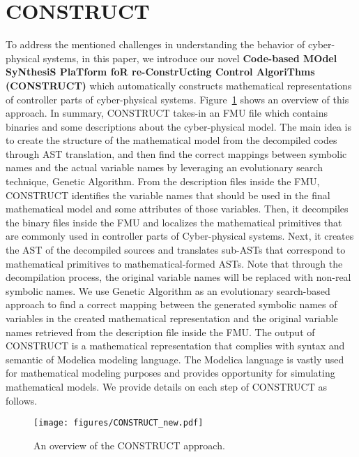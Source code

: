 \section{CONSTRUCT}
\label{sec:Construct}
To address the mentioned challenges in understanding the behavior of cyber-physical systems, in this paper, we introduce our novel \textbf{Code-based MOdel SyNthesiS PlaTform foR re-ConstrUcting Control AlgoriThms} \textsc{\textbf{(CONSTRUCT)}} which automatically constructs mathematical representations of controller parts of cyber-physical systems. Figure~\ref{fig:CONSTRUCT} shows an overview of this approach. 
In summary, \textsc{CONSTRUCT} takes-in an FMU file which contains binaries and some descriptions about the cyber-physical model. 
The main idea is to create the structure of the mathematical model from the decompiled codes through AST translation, and then find the correct mappings between symbolic names and the actual variable names by leveraging an evolutionary search technique, Genetic Algorithm.
From the description files inside the FMU, \textsc{CONSTRUCT} identifies the variable names that should be used in the final mathematical model and some attributes of those variables. Then, it decompiles the binary files inside the FMU and localizes the mathematical primitives that are commonly used in controller parts of Cyber-physical systems. Next, it creates the AST of the decompiled sources and translates sub-ASTs that correspond to mathematical primitives to mathematical-formed ASTs. Note that through the decompilation process, the original variable names will be replaced with non-real symbolic names. We use Genetic Algorithm as an evolutionary search-based approach to find a correct mapping between the generated symbolic names of variables in the created mathematical representation and the original variable names retrieved from the description file inside the FMU. The output of \textsc{CONSTRUCT} is a mathematical representation that complies with syntax and semantic of Modelica modeling language. The Modelica language is vastly used for mathematical modeling purposes and provides opportunity for simulating mathematical models. 
We provide details on each step of \textsc{CONSTRUCT} as follows.

\begin{figure}[ht]
  \centering
  \texttt{[image: figures/CONSTRUCT\_new.pdf]}
  \caption{An overview of the \textsc{CONSTRUCT} approach.}
  \label{fig:CONSTRUCT}
\end{figure}

